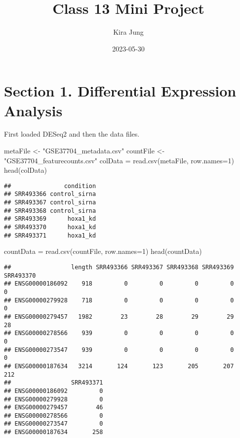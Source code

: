 \documentclass[
]{article}
\title{Class 13 Mini Project}
\author{Kira Jung}
\date{2023-05-30}
\newenvironment{Shaded}{\begin{snugshade}}{\end{snugshade}}
\newcommand{\AttributeTok}[1]{\textcolor[rgb]{0.77,0.63,0.00}{#1}}
\newcommand{\DecValTok}[1]{\textcolor[rgb]{0.00,0.00,0.81}{#1}}
\newcommand{\FunctionTok}[1]{\textcolor[rgb]{0.00,0.00,0.00}{#1}}
\newcommand{\NormalTok}[1]{#1}
\newcommand{\OtherTok}[1]{\textcolor[rgb]{0.56,0.35,0.01}{#1}}
\newcommand{\StringTok}[1]{\textcolor[rgb]{0.31,0.60,0.02}{#1}}
\begin{document}
\maketitle

\hypertarget{section-1.-differential-expression-analysis}{%
\section{Section 1. Differential Expression
Analysis}\label{section-1.-differential-expression-analysis}}

First loaded DESeq2 and then the data files.

\begin{Shaded}
\begin{Highlighting}[]
\NormalTok{metaFile }\OtherTok{\textless{}{-}} \StringTok{"GSE37704\_metadata.csv"}
\NormalTok{countFile }\OtherTok{\textless{}{-}} \StringTok{"GSE37704\_featurecounts.csv"}
\NormalTok{colData }\OtherTok{=} \FunctionTok{read.csv}\NormalTok{(metaFile, }\AttributeTok{row.names=}\DecValTok{1}\NormalTok{)}
\FunctionTok{head}\NormalTok{(colData)}
\end{Highlighting}
\end{Shaded}

\begin{verbatim}
##               condition
## SRR493366 control_sirna
## SRR493367 control_sirna
## SRR493368 control_sirna
## SRR493369      hoxa1_kd
## SRR493370      hoxa1_kd
## SRR493371      hoxa1_kd
\end{verbatim}

\begin{Shaded}
\begin{Highlighting}[]
\NormalTok{countData }\OtherTok{=} \FunctionTok{read.csv}\NormalTok{(countFile, }\AttributeTok{row.names=}\DecValTok{1}\NormalTok{)}
\FunctionTok{head}\NormalTok{(countData)}
\end{Highlighting}
\end{Shaded}

\begin{verbatim}
##                 length SRR493366 SRR493367 SRR493368 SRR493369 SRR493370
## ENSG00000186092    918         0         0         0         0         0
## ENSG00000279928    718         0         0         0         0         0
## ENSG00000279457   1982        23        28        29        29        28
## ENSG00000278566    939         0         0         0         0         0
## ENSG00000273547    939         0         0         0         0         0
## ENSG00000187634   3214       124       123       205       207       212
##                 SRR493371
## ENSG00000186092         0
## ENSG00000279928         0
## ENSG00000279457        46
## ENSG00000278566         0
## ENSG00000273547         0
## ENSG00000187634       258
\end{verbatim}
\end{document}
